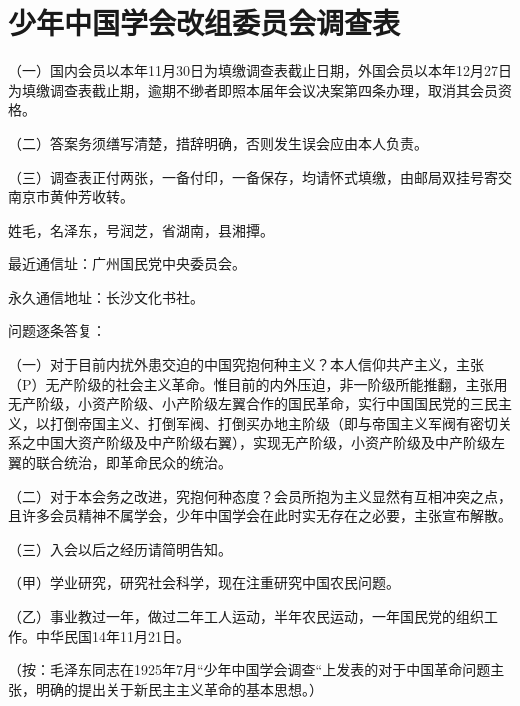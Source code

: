 \section[少年中国学会改组委员会调查表（一九二一年十一月二十一日）]{少年中国学会改组委员会调查表}


（一）国内会员以本年11月30日为填缴调查表截止日期，外国会员以本年12月27日为填缴调查表截止期，逾期不缈者即照本届年会议决案第四条办理，取消其会员资格。

（二）答案务须缮写清楚，措辞明确，否则发生误会应由本人负责。

（三）调查表正付两张，一备付印，一备保存，均请怀式填缴，由邮局双挂号寄交南京市黄仲芳收转。

姓毛，名泽东，号润芝，省湖南，县湘撢。

最近通信址：广州国民党中央委员会。

永久通信地址：长沙文化书社。

问题逐条答复：


（一）对于目前内扰外患交迫的中国究抱何种主义？本人信仰共产主义，主张（P）无产阶级的社会主义革命。惟目前的内外压迫，非一阶级所能推翻，主张用无产阶级，小资产阶级、小产阶级左翼合作的国民革命，实行中国国民党的三民主义，以打倒帝国主义、打倒军阀、打倒买办地主阶级（即与帝国主义军阀有密切关系之中国大资产阶级及中产阶级右翼），实现无产阶级，小资产阶级及中产阶级左翼的联合统治，即革命民众的统治。

（二）对于本会务之改进，究抱何种态度？会员所抱为主义显然有互相冲突之点，且许多会员精神不属学会，少年中国学会在此时实无存在之必要，主张宣布解散。

（三）入会以后之经历请简明告知。

（甲）学业研究，研究社会科学，现在注重研究中国农民问题。

（乙）事业教过一年，做过二年工人运动，半年农民运动，一年国民党的组织工作。中华民国14年11月21日。

（按：毛泽东同志在1925年7月“少年中国学会调查“上发表的对于中国革命问题主张，明确的提出关于新民主主义革命的基本思想。）

